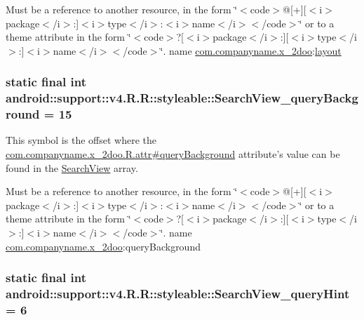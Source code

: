 Must be a reference to another resource, in the form \char`\"{}$<$code$>$@\mbox{[}+\mbox{]}\mbox{[}$<$i$>$package$<$/i$>$:\mbox{]}$<$i$>$type$<$/i$>$:$<$i$>$name$<$/i$>$$<$/code$>$\char`\"{} or to a theme attribute in the form \char`\"{}$<$code$>$?\mbox{[}$<$i$>$package$<$/i$>$:\mbox{]}\mbox{[}$<$i$>$type$<$/i$>$:\mbox{]}$<$i$>$name$<$/i$>$$<$/code$>$\char`\"{}.  name \hyperlink{namespacecom_1_1companyname_1_1x__2doo}{com.companyname.x\_\-2doo}:\hyperlink{classandroid_1_1support_1_1v4_1_1_r_1_1layout}{layout} \hypertarget{classandroid_1_1support_1_1v4_1_1_r_1_1styleable_9edc86d9cbb248a65311249ed4ca415c}{
\subsubsection[{SearchView\_\-queryBackground}]{\setlength{\rightskip}{0pt plus 5cm}static final int android::support::v4.R.R::styleable::SearchView\_\-queryBackground = 15}}
\label{classandroid_1_1support_1_1v4_1_1_r_1_1styleable_9edc86d9cbb248a65311249ed4ca415c}


This symbol is the offset where the \hyperlink{classcom_1_1companyname_1_1x__2doo_1_1_r_1_1attr_57becf88ba0b65e664b12d8dfb286647}{com.companyname.x\_\-2doo.R.attr\#queryBackground} attribute's value can be found in the \hyperlink{classandroid_1_1support_1_1v4_1_1_r_1_1styleable_63a589da97c59fb7eebd9759edb31f0d}{SearchView} array.

Must be a reference to another resource, in the form \char`\"{}$<$code$>$@\mbox{[}+\mbox{]}\mbox{[}$<$i$>$package$<$/i$>$:\mbox{]}$<$i$>$type$<$/i$>$:$<$i$>$name$<$/i$>$$<$/code$>$\char`\"{} or to a theme attribute in the form \char`\"{}$<$code$>$?\mbox{[}$<$i$>$package$<$/i$>$:\mbox{]}\mbox{[}$<$i$>$type$<$/i$>$:\mbox{]}$<$i$>$name$<$/i$>$$<$/code$>$\char`\"{}.  name \hyperlink{namespacecom_1_1companyname_1_1x__2doo}{com.companyname.x\_\-2doo}:queryBackground \hypertarget{classandroid_1_1support_1_1v4_1_1_r_1_1styleable_f0192b0ba88140e41e2b0f9db1bb970a}{
\subsubsection[{SearchView\_\-queryHint}]{\setlength{\rightskip}{0pt plus 5cm}static final int android::support::v4.R.R::styleable::SearchView\_\-queryHint = 6}}
\label{classandroid_1_1support_1_1v4_1_1_r_1_1styleable_f0192b0ba88140e41e2b0f9db1bb970a}


